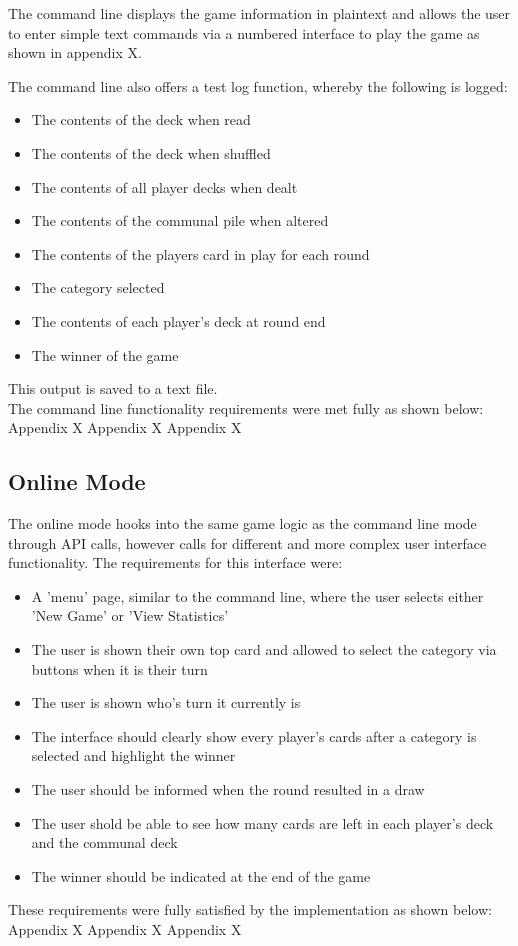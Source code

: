 The command line displays the game information in plaintext and allows the user to enter simple text commands via a numbered interface to play the game as shown in appendix X. \\

\newpage

The command line also offers a test log function, whereby the following is logged:
\begin{itemize}
\item The contents of the deck when read
\item The contents of the deck when shuffled
\item The contents of all player decks when dealt
\item The contents of the communal pile when altered
\item The contents of the players card in play for each round
\item The category selected
\item The contents of each player's deck at round end
\item The winner of the game
\end{itemize}

This output is saved to a text file. \\

The command line functionality requirements were met fully as shown below:
Appendix X
Appendix X
Appendix X

\subsection{Online Mode}
The online mode hooks into the same game logic as the command line mode through API calls, however calls for different and more complex user interface functionality. The requirements for this interface were:
\begin{itemize}
\item A 'menu' page, similar to the command line, where the user selects either 'New Game' or 'View Statistics'
\item The user is shown their own top card and allowed to select the category via buttons when it is their turn
\item The user is shown who's turn it currently is
\item The interface should clearly show every player's cards after a category is selected and highlight the winner
\item The user should be informed when the round resulted in a draw
\item The user shold be able to see how many cards are left in each player's deck and the communal deck
\item The winner should be indicated at the end of the game
\end{itemize}

These requirements were fully satisfied by the implementation as shown below:
Appendix X
Appendix X
Appendix X

